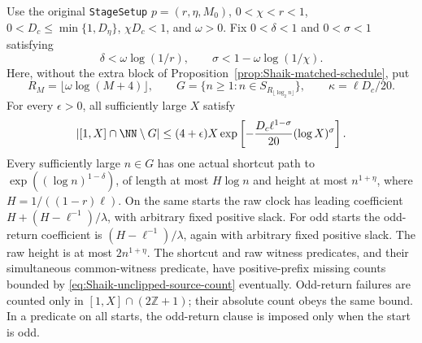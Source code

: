 \begin{corollary}
\label{cor:Shaik-unclipped-source-count}
Use the original \texttt{StageSetup} \(p=(r,\eta,M_0)\),
\(0<\chi<r<1\), \(0<D_c\le\min\{1,D_\eta\}\),
\(\chi D_c<1\), and \(\omega>0\).
Fix \(0<\delta<1\) and \(0<\sigma<1\) satisfying
\[
 \delta<\omega\log(1/r),\qquad
 \sigma<1-\omega\log(1/\chi).
\]
Here, without the extra block of Proposition~\ref{prop:Shaik-matched-schedule},
put
\[
 R_M=\lfloor\omega\log(M+4)\rfloor,\qquad
 G=\{n\ge1:n\in S_{R_{\lfloor\log_2n\rfloor}}\},\qquad
 \kappa=\ell D_c/20 .
\]
For every \(\epsilon>0\), all sufficiently large \(X\) satisfy
\begin{equation}\label{eq:Shaik-unclipped-source-count}
 |[1,X]\cap\NN\setminus G|
 \le(4+\epsilon)X
       \exp\left[-\frac{D_c\ell^{1-\sigma}}{20}
                         (\log X)^\sigma\right].
\end{equation}
Every sufficiently large \(n\in G\) has one actual shortcut path
to \(\exp((\log n)^{1-\delta})\), of length at most
\(H\log n\) and height at most \(n^{1+\eta}\),
where \(H=1/((1-r)\ell)\).
On the same starts the raw clock has leading coefficient
\(H+(H-\ell^{-1})/\lambda\), with arbitrary fixed positive slack.
For odd starts the odd-return coefficient is
\((H-\ell^{-1})/\lambda\), again with arbitrary fixed positive slack.
The raw height is at most \(2n^{1+\eta}\).
The shortcut and raw witness predicates, and their simultaneous
common-witness predicate, have positive-prefix missing counts bounded
by \eqref{eq:Shaik-unclipped-source-count} eventually.
Odd-return failures are counted only in \([1,X]\cap(2\mathbb Z+1)\);
their absolute count obeys the same bound. In a predicate on all starts,
the odd-return clause is imposed only when the start is odd.
\end{corollary}
